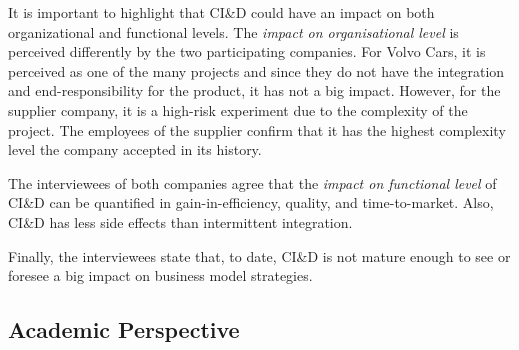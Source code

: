 It is important to highlight that  CI\&D could have an impact on both organizational and functional levels. 
%
%
The {\em impact on organisational level} is perceived differently by the two participating companies. For Volvo Cars, it is perceived as one of the many projects and since they do not have the integration and end-responsibility for the product, it has not a big impact. However, for the supplier company, it is a high-risk experiment due to the complexity of the project. The employees of the supplier confirm that it has the highest complexity level the company accepted in its history.

The interviewees of both companies agree that the {\em impact on functional level} of  CI\&D %
can be quantified in gain-in-efficiency, quality, and time-to-market. Also, CI\&D has less side effects than intermittent integration.  

Finally, the interviewees state that, to date,  CI\&D is not mature enough to see or foresee a big impact on business model strategies. 

\subsection{Academic Perspective}\label{sec:research}


